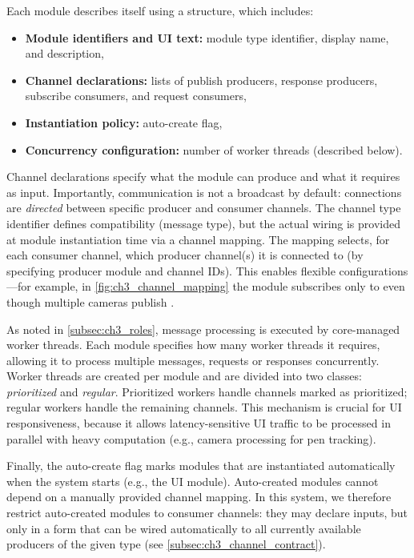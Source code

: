 Each module describes itself using a  structure, which includes:
\begin{itemize}
    \item \textbf{Module identifiers and UI text:} module type identifier, display name, and description,
    \item \textbf{Channel declarations:} lists of publish producers, response producers, subscribe consumers, and request consumers,
    \item \textbf{Instantiation policy:} auto-create flag,
    \item \textbf{Concurrency configuration:} number of worker threads (described below).
\end{itemize}

Channel declarations specify what the module can produce and what it requires as input. Importantly, communication is not a broadcast by default: connections are \emph{directed} between specific producer and consumer channels. The channel type identifier defines compatibility (message type), but the actual wiring is provided at module instantiation time via a channel mapping. The mapping selects, for each consumer channel, which producer channel(s) it is connected to (by specifying producer module and channel IDs). This enables flexible configurations---for example, in \autoref{fig:ch3_channel_mapping} the  module subscribes only to  even though multiple cameras publish .

As noted in \autoref{subsec:ch3_roles}, message processing is executed by core-managed worker threads. Each module specifies how many worker threads it requires, allowing it to process multiple messages, requests or responses concurrently. Worker threads are created per module and are divided into two classes: \emph{prioritized} and \emph{regular}. Prioritized workers handle channels marked as prioritized; regular workers handle the remaining channels. This mechanism is crucial for UI responsiveness, because it allows latency-sensitive UI traffic to be processed in parallel with heavy computation (e.g., camera processing for pen tracking).

Finally, the auto-create flag marks modules that are instantiated automatically when the system starts (e.g., the UI module). Auto-created modules cannot depend on a manually provided channel mapping. In this system, we therefore restrict auto-created modules to  consumer channels: they may declare inputs, but only in a form that can be wired automatically to all currently available producers of the given type (see \autoref{subsec:ch3_channel_contract}).


